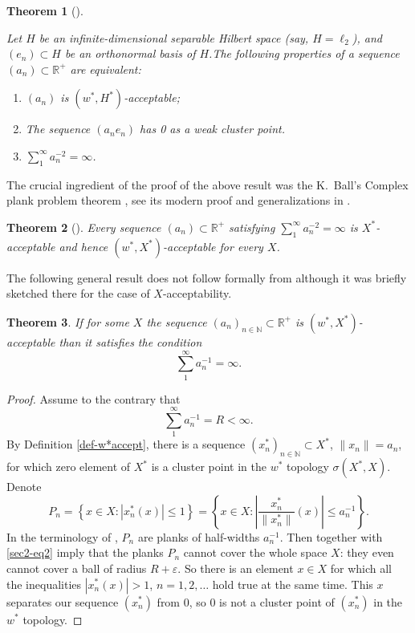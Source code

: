 \documentclass[11pt,twoside, reqno]{amsart}
\newcommand{\eps}{\varepsilon}
\newcommand{\N}{{\mathbb N}}
\theoremstyle{plain}
\newtheorem{theorem}{Theorem}[section]
\theoremstyle{remark}
\theoremstyle{definition}
\numberwithin{equation}{section}
\begin{document}
\begin{theorem}[{\cite[Theorem 3.1 and Proposition 2.2]{Kad-cyl}}]
\label{theo-Kad-cyl1}  

Let $H$ be an infinite-dimensional separable Hilbert space (say, $H=\ell_2$), and $(e_n) \subset H$ be an orthonormal basis of $H$.The following properties of a sequence $(a_n) \subset {\mathbb{R}}^+$ are equivalent:

\begin{enumerate}
\item[(i)] $(a_n)$ is $(w^*, H^*)$-acceptable;

\item[(ii)] The sequence $(a_n e_n)$ has 0 as a weak cluster point.

\item[(iii)] $\sum_1^\infty a_n^{-2}=\infty$.
\end{enumerate}
\end{theorem}

The crucial ingredient of the proof of the above result was the K.~Ball's Complex plank problem theorem \cite{comp}, see its modern proof and generalizations in \cite{GKP24}.

\begin{theorem}[{\cite[Corollary 5.2]{Kad-cyl}}]
\label{theo-Kad-cyl2}  
Every sequence $(a_n) \subset {\mathbb{R}}^+$ satisfying $\sum_1^\infty a_n^{-2}=\infty$ is $X^*$-acceptable and hence $(w^*, X^*)$-acceptable for every $X$.
\end{theorem}

The following general result does not follow formally from \cite{Kad-cyl} although it was briefly sketched there for the case of $X$-acceptability.

\begin{theorem}
\label{theo-Kad-Ball}  
If for some $X$ the sequence $(a_n)_{n \in \N} \subset {\mathbb{R}}^+$  is $(w^*, X^*)$-acceptable than it satisfies the condition 
\begin{equation*} \label{sec2-eq1}
\sum_1^\infty a_n^{-1}=\infty. 
\end{equation*}
\end{theorem}
\begin{proof}
Assume to the contrary that
\begin{equation} \label{sec2-eq2}
\sum_1^\infty a_n^{-1}=R<\infty. 
\end{equation}
By Definition \ref{def-w*accept}, there is a sequence $(x_n^*)_{n \in \N} \subset X^* $, $\|x_n\|=a_n$, for which zero element of $X^*$ is a cluster point in the $w^*$ topology $\sigma(X^*, X)$. Denote
$$
P_n=\left\{x \in X : \left|x_n^*(x)\right| \le 1\right\}=\left\{x \in X : \left|\frac{x_n^*}{\|x_n^*\|}(x)\right| \le a_n^{-1}\right\}.
$$
In the terminology of \cite{ball1}, $P_n$ are planks of half-widths $a_n^{-1}$. Then \cite[Theorem 1]{ball1} together with \eqref{sec2-eq2} imply that the planks $P_n$ cannot cover the whole space $X$: they even cannot cover
a ball of radius $R + \eps$. So there is an element $x \in X$ for which all the inequalities $\left|x_n^*(x)\right| > 1$, $n = 1,2, \ldots$ hold true at the same time. This $x$ separates our sequence $(x_n^*)$ from 0, so 0  is not a cluster point of $(x_n^*)$ in the $w^*$ topology.
\end{proof}
\end{document}
